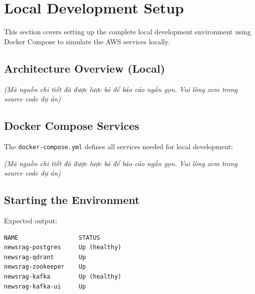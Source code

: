 \hypertarget{local-development-setup}{%
\section{Local Development Setup}}

This section covers setting up the complete local development
environment using Docker Compose to simulate the AWS services locally.

\hypertarget{architecture-overview-local}{%
\subsection{Architecture Overview
(Local)}}

\emph{(Mã nguồn chi tiết đã được lược bỏ để báo cáo ngắn gọn. Vui lòng
xem trong source code dự án)}

\hypertarget{docker-compose-services}{%
\subsection{Docker Compose Services}}

The \texttt{docker-compose.yml} defines all services needed for local
development:

\emph{(Mã nguồn chi tiết đã được lược bỏ để báo cáo ngắn gọn. Vui lòng
xem trong source code dự án)}

\hypertarget{starting-the-environment}{%
\subsection{Starting the Environment}}

\begin{Shaded}
\begin{Highlighting}[]


\end{Highlighting}
\end{Shaded}

Expected output:

\begin{verbatim}
NAME                 STATUS
newsrag-postgres     Up (healthy)
newsrag-qdrant       Up
newsrag-zookeeper    Up
newsrag-kafka        Up (healthy)
newsrag-kafka-ui     Up
\end{verbatim}

